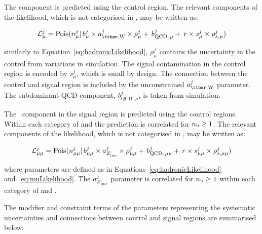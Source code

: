 The \ttw component is predicted using the \mj control region. The relevant 
components of the likelihood, which is not categorised in \mht, may be written as:

\begin{equation}
\label{eq:muLikelihood}
\mathcal{L}^{j}_{\mu} = \mathrm{Pois}(n^{j}_{\mu} |\, b^{j}_{\mu}\times a_{\ttw}^{j}\times\rho^{j}_{\mu} +\, b^{j}_{\text{QCD},\,\mu} + \,r \times s^{j}_{\mu}\times\rho^{j}_{s,\mu})
\end{equation}

similarly to Equation~\ref{eq:hadronicLikelihood}, $\rho^{j}_{\mu}$ contains the uncertainty in the control \htcat from variations in simulation. 
The signal contamination in the control region is encoded by $s^{j}_{\mu}$, which is small by design. 
The connection between the control and signal region
is included by the unconstrained $a_{\ttw}^{j}$ parameter. The 
subdominant QCD component, $b^{j}_{\text{QCD},\,\mu}$, is taken from simulation. 

The \zInv~component in the signal region is predicted using the \mmj control regions. 
Within each category of \njet and \scalht the prediction is correlated 
for  $n_{\text{b}} \geq 1$. The relevant components of the likelihood, which is not categorised in \mht, may be written as:

\begin{equation}
\label{eq:mumuLikelihood}
\mathcal{L}^{j}_{\mu\mu} = \mathrm{Pois}(n^{j}_{\mu\mu} |\, b^{j}_{\mu\mu}\times a_{Z_{\rm inv}^{~}}^{j}\times\rho^{j}_{\mu\mu} +\, b^{j}_{\text{QCD},\,\mu\mu} + \,r \times s^{j}_{\mu\mu}\times\rho^{j}_{s,\mu\mu})
\end{equation}

where parameters are defined as in Equations~\ref{eq:hadronicLikelihood} and~\ref{eq:muLikelihood}. 
The $a_{Z_{\rm inv}^{~}}^{j}$ parameter is correlated for $n_{\text{b}} \geq 1$ within each 
category of \njet and \scalht.

The modifier and constraint terms of the parameters representing the systematic uncertainties and 
connections between control and signal regions are summarised below:

